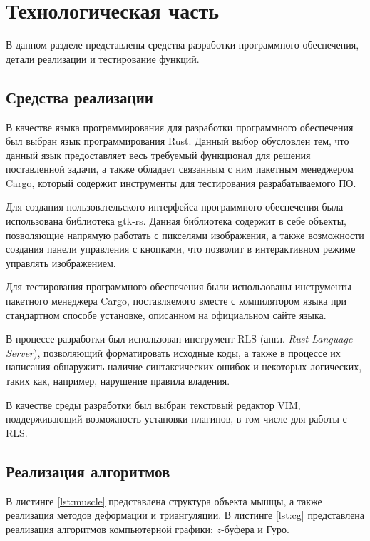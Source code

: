 \chapter{Технологическая часть}

В данном разделе представлены средства разработки программного обеспечения, детали реализации и тестирование функций.

\section{Средства реализации}

В качестве языка программирования для разработки программного обеспечения был выбран язык программирования Rust\cite{rust}. Данный выбор обусловлен тем, что данный язык предоставляет весь требуемый функционал для решения поставленной задачи, а также обладает связанным с ним пакетным менеджером Cargo\cite{cargo}, который содержит инструменты для тестирования разрабатываемого ПО\cite{rusttest}.

Для создания пользовательского интерфейса программного обеспечения была использована библиотека gtk-rs\cite{gtk-rs}. Данная библиотека содержит в себе объекты, позволяющие напрямую работать с пикселями изображения, а также возможности создания панели управления с кнопками, что позволит в интерактивном режиме управлять изображением.

Для тестирования программного обеспечения были использованы инструменты пакетного менеджера Cargo\cite{cargo}, поставляемого вместе с компилятором языка при стандартном способе установке, описанном на официальном сайте языка\cite{rust}. 

В процессе разработки был использован инструмент RLS\cite{rls} (англ. \textit{Rust Language Server}), позволяющий форматировать исходные коды, а также в процессе их написания обнаружить наличие синтаксических ошибок и некоторых логических, таких как, например, нарушение правила владения\cite{rust-learn}.

В качестве среды разработки был выбран текстовый редактор VIM\cite{vim}, поддерживающий возможность установки плагинов\cite{vim-plugins}, в том числе для работы с RLS\cite{rls}.

\section{Реализация алгоритмов}

В листинге \ref{lst:muscle} представлена структура объекта мышцы, а также реализация методов деформации и триангуляции. В листинге \ref{lst:cg} представлена реализация алгоритмов компьютерной графики: $z$-буфера и Гуро.

